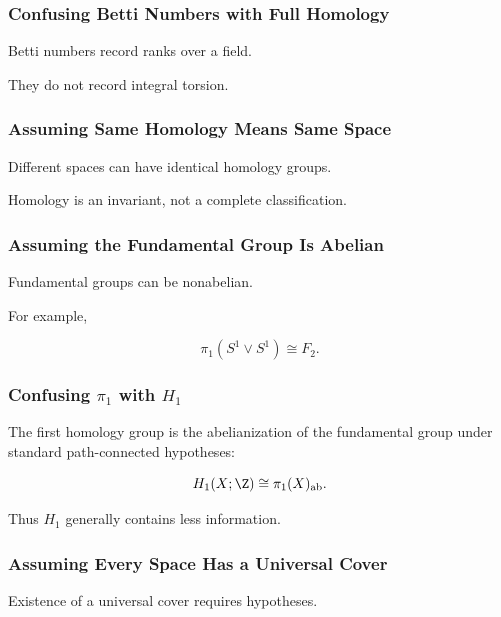 \subsubsection{Confusing Betti Numbers with Full Homology}

Betti numbers record ranks over a field.

They do not record integral torsion.

\subsubsection{Assuming Same Homology Means Same Space}

Different spaces can have identical homology groups.

Homology is an invariant, not a complete classification.

\subsubsection{Assuming the Fundamental Group Is Abelian}

Fundamental groups can be nonabelian.

For example,

\[
\pi_1(S^1\vee S^1)
\cong
F_2.
\]

\subsubsection{Confusing \texorpdfstring{\(\pi_1\)}{pi1} with
\texorpdfstring{\(H_1\)}{H1}}

The first homology group is the abelianization of the fundamental group under
standard path-connected hypotheses:

\[
H_1(X;\Z)
\cong
\pi_1(X)_{\mathrm{ab}}.
\]

Thus \(H_1\) generally contains less information.

\subsubsection{Assuming Every Space Has a Universal Cover}

Existence of a universal cover requires hypotheses.

